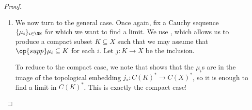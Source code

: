 \documentclass[../notes.tex]{subfiles}
\begin{document}
\begin{proof}
\begin{enumerate}
		\item We now turn to the general case. Once again, fix a Cauchy sequence $\{\mu_i\}_{i\in\NN}$ for which we want to find a limit. We use , which allows us to produce a compact subset $K\subseteq X$ such that we may assume that $\op{supp}\mu_i\subseteq K$ for each $i$. Let $j\colon K\to X$ be the inclusion.
		
		To reduce to the compact case, we note that  shows that the $\mu_i$s are in the image of the topological embedding $j_*\colon C(K)^*\to C(X)^*$, so it is enough to find a limit in $C(K)^*$. This is exactly the compact case!
		\qedhere
	\end{enumerate}
\end{proof}
\end{document}
